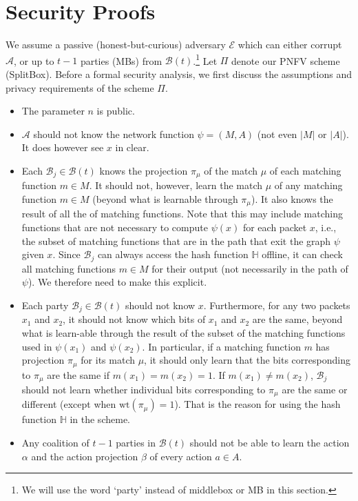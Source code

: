 \RequirePackage{fix-cm} \let\oldvec\vec \documentclass{sig-alternate-05-2015}
\newif\ifshort
\begin{document}



\ifshort
\else

  \appendix
  \section{Security Proofs}
\label{app:sec-proofs}
We assume a passive (honest-but-curious) adversary $\mathcal{E}$ which can either corrupt $\mathcal{A}$, or up to $t - 1$ parties (MBs) from $\mathcal{B}(t)$.\footnote{\small We will use the word `party' instead of middlebox or MB in this section.} Let $\Pi$ denote our PNFV scheme (SplitBox). Before a formal security analysis, we first discuss the assumptions and privacy requirements of the scheme $\Pi$.
\begin{itemize}
	\item The parameter $n$ is public. 
	\item $\mathcal{A}$ should not know the network function $\psi = (M, A)$ (not even $|M|$ or $|A|$). It does however see $x$ in clear. 
	\item Each $\mathcal{B}_j \in \mathcal{B}(t)$ knows the projection $\pi_\mu$ of the match $\mu$ of each matching function $m \in M$. It should not, however, learn the match $\mu$ of any matching function $m \in M$ (beyond what is learnable through $\pi_\mu$). It also knows the result of all the of matching functions. Note that this may include matching functions that are not necessary to compute $\psi(x)$ for each packet $x$, i.e., the subset of matching functions that are in the path that exit the graph $\psi$ given $x$. Since $\mathcal{B}_j$ can always access the hash function $\mathbb{H}$ offline, it can check all matching functions $m \in M$ for their output (not necessarily in the path of $\psi$). We therefore need to make this explicit. 
	\item Each party $\mathcal{B}_j \in \mathcal{B}(t)$ should not know $x$. Furthermore, for any two packets $x_1$ and $x_2$, it should not know which bits of $x_1$ and $x_2$ are the same, beyond what is learn-able through the result of the subset of the matching functions used in $\psi(x_1)$ and $\psi(x_2)$. In particular, if a matching function $m$ has projection $\pi_{\mu}$ for its match $\mu$, it should only learn that the bits corresponding to $\pi_{\mu}$ are the same if $m(x_1) = m(x_2) = 1$. If $m(x_1) \ne m(x_2)$, $\mathcal{B}_j$ should not learn whether individual bits corresponding to $\pi_{\mu}$ are the same or different (except when $\text{wt}(\pi_\mu) = 1$). That is the reason for using the hash function $\mathbb{H}$ in the scheme. 
	\item Any coalition of $t - 1$ parties in $\mathcal{B}(t)$ should not be able to learn the action $\alpha$ and the action projection $\beta$ of every action $a \in A$. 
\end{itemize} 
\end{document}
